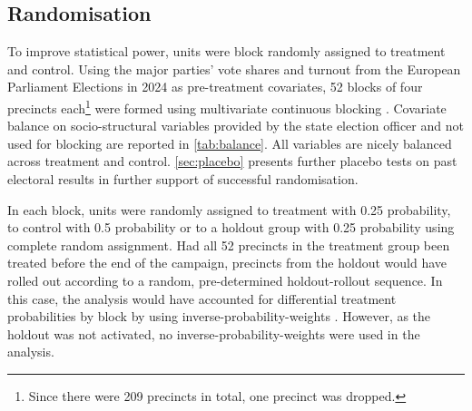 \documentclass[11pt,a4paper]{scrartcl}
\begin{document}
\subsection{Randomisation}\label{sec-randomisation}

To improve statistical power, units were block randomly assigned to treatment and control. Using  the major parties' vote shares and turnout from the European Parliament Elections in 2024 as pre-treatment covariates, 52  blocks of four precincts each\footnote{Since there were 209 precincts in total, one precinct was dropped.} were formed using multivariate continuous blocking \autocite{mooreMultivariateContinuousBlocking2017}. Covariate balance on socio-structural variables provided by the state election officer \autocite{amtfurstatistikberlin-brandenburgStrukturdatenFurWahl2024} and not used for blocking are reported in \autoref{tab:balance}. All variables are nicely balanced across treatment and control. \autoref{sec:placebo} presents further placebo tests on past electoral results in further support of successful randomisation.



In each block, units were randomly assigned to treatment with 0.25 probability, to control with 0.5 probability or to a holdout group with 0.25 probability using complete random assignment. 	Had all 52 precincts in the treatment group been treated before the end of the campaign, precincts from the holdout would have rolled out according to a random, pre-determined holdout-rollout sequence. In this case, the analysis would have accounted for differential treatment probabilities by block by using inverse-probability-weights \autocite[76]{gerberFieldExperimentsDesign2012}. However, as the holdout was not activated, no inverse-probability-weights were used in the analysis.
\end{document}
